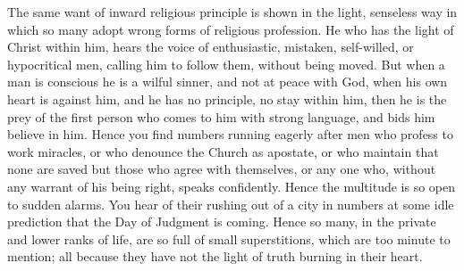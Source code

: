 The same want of inward religious principle is shown in the light,
senseless way in which so many adopt wrong forms of religious
profession. He who has the light of Christ within him, hears the voice
of enthusiastic, mistaken, self-willed, or hypocritical men, calling
him to follow them, without being moved. But when a man is conscious
he is a wilful sinner, and not at peace with God, when his own heart
is against him, and he has no principle, no stay within him, then he
is the prey of the first person who comes to him with strong language,
and bids him believe in him. Hence you find numbers running eagerly
after men who profess to work miracles, or who denounce the Church as
apostate, or who maintain that none are saved but those who agree with
themselves, or any one who, without any warrant of his being right,
speaks confidently. Hence the multitude is so open to sudden alarms.
You hear of their rushing out of a city in numbers at some idle
prediction that the Day of Judgment is coming. Hence so many, in the
private and lower ranks of life, are so full of small superstitions,
which are too minute to mention; all because they have not the light
of truth burning in their heart.

